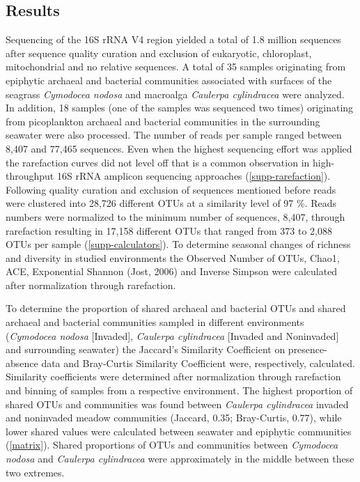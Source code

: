 \documentclass[12pt,]{article}
\begin{document}
\hypertarget{results}{%
\subsection{Results}\label{results}}

Sequencing of the 16S rRNA V4 region yielded a total of 1.8 million
sequences after sequence quality curation and exclusion of eukaryotic,
chloroplast, mitochondrial and no relative sequences. A total of 35
samples originating from epiphytic archaeal and bacterial communities
associated with surfaces of the seagrass \emph{Cymodocea nodosa} and
macroalga \emph{Caulerpa cylindracea} were analyzed. In addition, 18
samples (one of the samples was sequenced two times) originating from
picoplankton archaeal and bacterial communities in the surrounding
seawater were also processed. The number of reads per sample ranged
between 8,407 and 77,465 sequences. Even when the highest sequencing
effort was applied the rarefaction curves did not level off that is a
common observation in high-throughput 16S rRNA amplicon sequencing
approaches (\autoref{supp-rarefaction}). Following quality curation and
exclusion of sequences mentioned before reads were clustered into 28,726
different OTUs at a similarity level of 97 \si{\percent}. Reads numbers
were normalized to the minimum number of sequences, 8,407, through
rarefaction resulting in 17,158 different OTUs that ranged from 373 to
2,088 OTUs per sample (\autoref{supp-calculators}). To determine
seasonal changes of richness and diversity in studied environments the
Observed Number of OTUs, Chao1, ACE, Exponential Shannon (Jost, 2006)
and Inverse Simpson were calculated after normalization through
rarefaction.

To determine the proportion of shared archaeal and bacterial OTUs and
shared archaeal and bacterial communities sampled in different
environments (\emph{Cymodocea nodosa} {[}Invaded{]}, \emph{Caulerpa
cylindracea} {[}Invaded and Noninvaded{]} and surrounding seawater) the
Jaccard's Similarity Coefficient on presence-absence data and
Bray-Curtis Similarity Coefficient were, respectively, calculated.
Similarity coefficients were determined after normalization through
rarefaction and binning of samples from a respective environment. The
highest proportion of shared OTUs and communities was found between
\emph{Caulerpa cylindracea} invaded and noninvaded meadow communities
(Jaccard, 0.35; Bray-Curtis, 0.77), while lower shared values were
calculated between seawater and epiphytic communities
(\autoref{matrix}). Shared proportions of OTUs and communities between
\emph{Cymodocea nodosa} and \emph{Caulerpa cylindracea} were
approximately in the middle between these two extremes.
\end{document}
